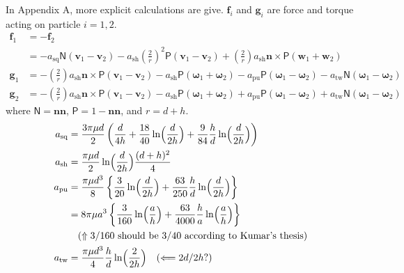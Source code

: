 \documentclass[11pt]{scrartcl}
\newcommand{\tens}[1]{\bm{\mathsf{#1}}}
\begin{document}
In Appendix A, more explicit calculations are give.
$\bm{f}_i$ and $\bm{g}_i$ are force and torque acting on particle $i = 1,2$.
\begin{align*}
 \bm{f}_1 & =  -\bm{f}_2 \\
&=- a_{\mathrm{sq}} \tens{N}  (\bm{v}_1 - \bm{v}_2)
- a_{\mathrm{sh}} \left(\frac{2}{r}\right)^2
\tens{P} (\bm{v}_1 - \bm{v}_2)
+ \left(\frac{2}{r}\right) a_{\mathrm{sh}}
\bm{n} \times \tens{P} (\bm{w}_1 + \bm{w}_2) \\
\bm{g}_1 &= 
-\left(\frac{2}{r}\right) a_{\mathrm{sh}}
\bm{n} \times \tens{P}(\bm{v}_1-\bm{v}_2)
- a_{\mathrm{sh}} \tens{P}(\bm{\omega}_1+\bm{\omega}_2)
- a_{\mathrm{pu}} \tens{P}(\bm{\omega}_1-\bm{\omega}_2)
- a_{\mathrm{tw}} \tens{N}(\bm{\omega}_1-\bm{\omega}_2) \\
\bm{g}_2 &= 
-\left(\frac{2}{r}\right) a_{\mathrm{sh}}
\bm{n} \times \tens{P}(\bm{v}_1-\bm{v}_2)
- a_{\mathrm{sh}} \tens{P}(\bm{\omega}_1+\bm{\omega}_2)
+ a_{\mathrm{pu}} \tens{P}(\bm{\omega}_1-\bm{\omega}_2)
+ a_{\mathrm{tw}} \tens{N}(\bm{\omega}_1-\bm{\omega}_2)
\end{align*}
where $\tens{N} = \bm{n}\bm{n}$,
$\tens{P} =1- \bm{n}\bm{n}$,
and 
$r = d + h$.
\begin{align*}
 a_{\mathrm{sq}}& = \frac{3 \pi \mu d}{2}
\left(
\frac{d}{4h} 
+ \frac{18}{40} \ln\Bigl( \frac{d}{2h}\Bigr)
+ \frac{9}{84} \frac{h}{d} \ln\Bigl( \frac{d}{2h}\Bigr)
\right)\\
 a_{\mathrm{sh}}
&= 
\frac{\pi \mu d }{2}
\ln\Bigl( \frac{d}{2h}\Bigr) \frac{(d+h)^2}{4}\\
 a_{\mathrm{pu}}& = 
\frac{\pi \mu d^3 }{8}
\left\{
\frac{3}{20}\ln\Bigl(\frac{d}{2h}\Bigr)
+
\frac{63}{250}\frac{h}{d}\ln\Bigl(\frac{d}{2h}\Bigr)
\right\}\\
& = 
8 \pi \mu a^3 
\left\{
\frac{3}{160}\ln\Bigl(\frac{a}{h}\Bigr)
+
\frac{63}{4000}\frac{h}{a}\ln\Bigl(\frac{a}{h}\Bigr)
\right\} \\
&\quad (\Uparrow
\text{$3/160$ should be $3/40$ according to Kumar's thesis})
\\
a_{\mathrm{tw}}
 &= 
\frac{\pi \mu d^3 }{4}
\frac{h}{d}
\ln\Bigl(\frac{2}{2h}\Bigr) \quad (\Longleftarrow\text{$2d/2h$?})
\end{align*}
\end{document}
